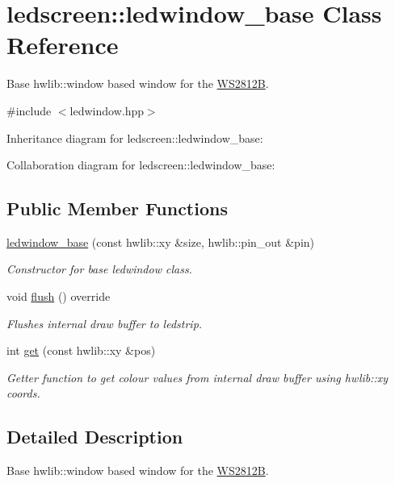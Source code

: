 \hypertarget{classledscreen_1_1ledwindow__base}{}\section{ledscreen\+:\+:ledwindow\+\_\+base Class Reference}
\label{classledscreen_1_1ledwindow__base}


Base hwlib\+::window based window for the \hyperlink{classledscreen_1_1WS2812B}{W\+S2812B}.  




{\ttfamily \#include $<$ledwindow.\+hpp$>$}



Inheritance diagram for ledscreen\+:\+:ledwindow\+\_\+base\+:


Collaboration diagram for ledscreen\+:\+:ledwindow\+\_\+base\+:
\subsection*{Public Member Functions}
\begin{DoxyCompactItemize}
\item 
\hyperlink{classledscreen_1_1ledwindow__base_aabe3e38cf9ec10d481d6e4eba5fa6c86}{ledwindow\+\_\+base} (const hwlib\+::xy \&size, hwlib\+::pin\+\_\+out \&pin)
\begin{DoxyCompactList}\small\item\em Constructor for base ledwindow class. \end{DoxyCompactList}\item 
void \hyperlink{classledscreen_1_1ledwindow__base_ab64f6d49e338937277579e3b4d74c363}{flush} () override
\begin{DoxyCompactList}\small\item\em Flushes internal draw buffer to ledstrip. \end{DoxyCompactList}\item 
int \hyperlink{classledscreen_1_1ledwindow__base_a3d31f2ab0eccbf96c5af2082a39e90c6}{get} (const hwlib\+::xy \&pos)
\begin{DoxyCompactList}\small\item\em Getter function to get colour values from internal draw buffer using hwlib\+::xy coords. \end{DoxyCompactList}\end{DoxyCompactItemize}


\subsection{Detailed Description}
Base hwlib\+::window based window for the \hyperlink{classledscreen_1_1WS2812B}{W\+S2812B}. 

